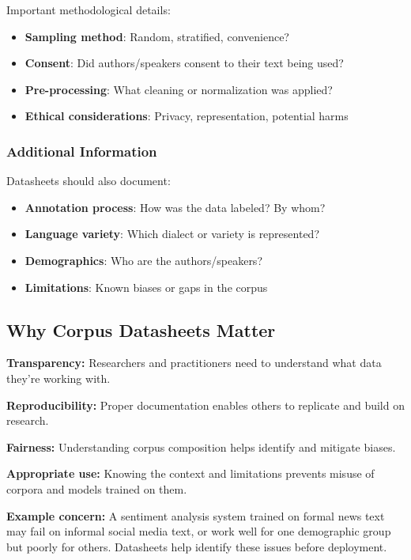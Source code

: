 \documentclass[11pt,a4paper]{article}
\theoremstyle{definition}
\theoremstyle{plain}
\theoremstyle{remark}
\begin{document}
Important methodological details:
\begin{itemize}
    \item \textbf{Sampling method}: Random, stratified, convenience?
    \item \textbf{Consent}: Did authors/speakers consent to their text being used?
    \item \textbf{Pre-processing}: What cleaning or normalization was applied?
    \item \textbf{Ethical considerations}: Privacy, representation, potential harms
\end{itemize}

\subsubsection{Additional Information}

Datasheets should also document:
\begin{itemize}
    \item \textbf{Annotation process}: How was the data labeled? By whom?
    \item \textbf{Language variety}: Which dialect or variety is represented?
    \item \textbf{Demographics}: Who are the authors/speakers?
    \item \textbf{Limitations}: Known biases or gaps in the corpus
\end{itemize}

\subsection{Why Corpus Datasheets Matter}

\textbf{Transparency:} Researchers and practitioners need to understand what data they're working with.

\textbf{Reproducibility:} Proper documentation enables others to replicate and build on research.

\textbf{Fairness:} Understanding corpus composition helps identify and mitigate biases.

\textbf{Appropriate use:} Knowing the context and limitations prevents misuse of corpora and models trained on them.

\textbf{Example concern:} A sentiment analysis system trained on formal news text may fail on informal social media text, or work well for one demographic group but poorly for others. Datasheets help identify these issues before deployment.
\end{document}
